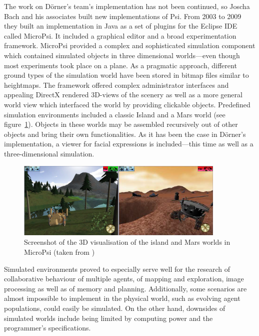 The work on Dörner's team's implementation has not been continued, so Joscha Bach and his associates built new implementations of Psi. From 2003 to 2009 they built an implementation in Java as a set of plugins for the Eclipse IDE called MicroPsi. It included a graphical editor and a broad experimentation framework. MicroPsi provided a complex and sophisticated simulation component which contained simulated objects in three dimensional worlds---even though most experiments took place on a plane. As a pragmatic approach, different ground types of the simulation world have been stored in bitmap files similar to heightmaps. The framework offered complex administrator interfaces and appealing DirectX rendered 3D-views of the scenery as well as a more general world view which interfaced the world by providing clickable objects. Predefined simulation environments included a classic Island and a Mars world (see figure~\ref{micropsi_3d_screen}). Objects in these worlds may be assembled recursively out of other objects and bring their own functionalities. As it has been the case in Dörner's implementation, a viewer for facial expressions is included---this time as well as a three-dimensional simulation.~\cite{Bach:2009:PSI:1611304}


\begin{figure}[h]
  \centering
    \includegraphics[width=10cm]{graphics/micropsi_3d_screen}
  \caption{Screenshot of the 3D visualisation of the island and Mars worlds in MicroPsi (taken from \cite{Bach:2009:PSI:1611304})}
  \label{micropsi_3d_screen}
\end{figure}

Simulated environments proved to especially serve well for the research of collaborative behaviour of multiple agents, of mapping and exploration, image processing as well as of memory and planning. Additionally, some scenarios are almost impossible to implement in the physical world, such as evolving agent populations, could easily be simulated. On the other hand, downsides of simulated worlds include being limited by computing power and the programmer's specifications.~\cite{Bach:2009:PSI:1611304}

